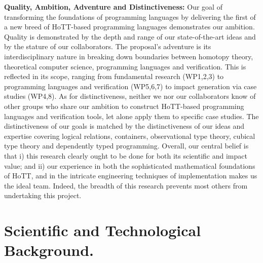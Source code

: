 \documentclass[a4paper,11pt]{article}
\begin{document}
  {\bf Quality, Ambition, Adventure and Distinctiveness:} Our goal of
  transforming the foundations of programming languages by delivering
  the first of a new breed of HoTT-based programming languages
  demonstrates our ambition. Quality is demonstrated by
  the depth and range of our state-of-the-art ideas and by
  the stature of our collaborators. The proposal's adventure is its
  interdisciplinary nature in breaking down boundaries between
  homotopy theory, theoretical computer science, programming languages
  and verification. This is reflected in its scope,
  ranging from fundamental research (WP1,2,3) to programming languages
  and verification (WP5,6,7) to impact generation via case studies
  (WP4,8). As for distinctiveness, neither we nor our collaborators
  know of other groups who share our ambition to construct HoTT-based
  programming languages and verification tools, let alone apply them
  to specific case studies. The distinctiveness of our goals is
  matched by the distinctiveness of our ideas and expertise covering
  logical relations, containers, observational type theory, cubical
  type theory and dependently typed programming.  Overall, our central
  belief is that i) this research clearly ought to be done for both
  its scientific and impact value; and ii) our experience in both the
  sophisticated mathematical foundations of HoTT, and in the intricate
  engineering techniques of implementation makes us the ideal team.
  Indeed, the breadth of this research prevents most others from undertaking
  this project.




%







\vspace*{-0.1in} 



\vspace*{-0.1in} 
\section{Scientific and Technological Background.}
\vspace*{-0.1in} 
\end{document}
